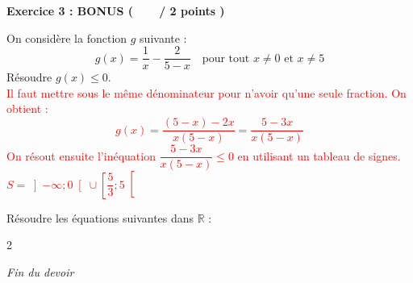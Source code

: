 \documentclass[12pt,a4paper]{exam}
\begin{document}
\vspace{10pt}

\noindent
\textbf{Exercice 3 : BONUS (\ \ \ \  / 2 points )}
\vspace{5pt}

\begin{questions}

\question[1] On considère la fonction $g$ suivante :
\[
g(x) = \dfrac{1}{x} - \dfrac{2}{5-x} \quad \text{pour tout $x \neq 0$ et $x \neq 5$}
\]
Résoudre $g(x) \leq 0$.
\textcolor{red}{
\vspace{5pt}
\\
Il faut mettre sous le même dénominateur pour n'avoir qu'une seule fraction. On obtient :
\[
g(x) = \dfrac{(5-x) - 2x}{x(5-x)} = \dfrac{5-3x}{x(5-x)}
\]
On résout ensuite l'inéquation $\dfrac{5-3x}{x(5-x)} \leq 0$ en utilisant un tableau de signes.
\\$S = \left]-\infty; 0\right[ \cup \left[\dfrac{5}{3}; 5\right[$
}

\vspace{5pt}

\question[1] Résoudre les équations suivantes dans $\mathbb{R}$ :
\begin{multicols}{2}
\end{multicols}

\end{questions}

\vspace{10pt}

\begin{center}
    \textit{Fin du devoir}
\end{center}
\end{document}
